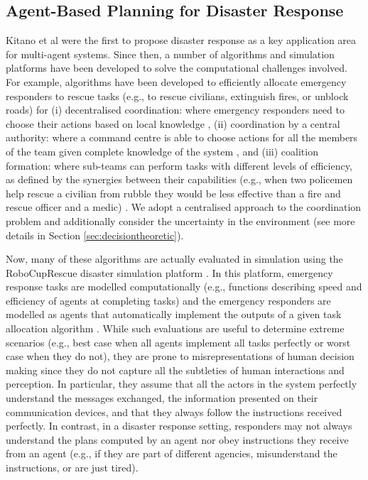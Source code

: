 \subsection{Agent-Based Planning for Disaster Response}\label{sec:agentsdisasters}
Kitano et al \cite{kitano:2001} were the first to propose disaster response as a key application area for multi-agent systems. Since then, a number of algorithms and simulation platforms have been developed to solve the computational challenges involved. For example, algorithms  have been developed to efficiently allocate emergency responders to rescue tasks (e.g., to rescue civilians, extinguish fires, or unblock roads) for (i) decentralised coordination: where emergency responders need to choose their actions based on local knowledge \cite{Chapman2009,puyol:etal:2014}, (ii)  coordination by a central authority: where a command centre is able to choose actions for all the members of the team given complete knowledge of the system \cite{koes2006constraint,Scerri2005,Khan-2011-JAAMAS}, and (iii) coalition formation: where sub-teams can perform tasks with different levels of efficiency, as defined by the synergies between their capabilities (e.g., when two policemen help rescue a civilian from rubble they would be less effective than a fire and rescue officer and a medic) \cite{ramchurn:etal:2010}.  We  adopt a centralised approach to the coordination problem and additionally consider the uncertainty in the environment (see more details in Section \ref{sec:decisiontheoretic}).

Now, many of these algorithms are actually evaluated in simulation using the  RoboCupRescue disaster simulation platform \cite{skinner:ramchurn:2010}. In this platform, emergency response tasks are modelled computationally (e.g., functions describing speed and efficiency of agents at completing tasks) and the emergency responders are modelled as agents that automatically implement the outputs of a given task allocation algorithm \cite{kleiner:etal:2013,ramchurn:etal:2010}. While such evaluations are useful to determine extreme scenarios (e.g., best case when all agents implement all tasks perfectly or worst case when they do not), they are prone to misrepresentations of human decision making since they do not capture all the subtleties of human interactions and perception. In particular, they assume that all the actors in the system perfectly understand the messages exchanged, the information presented on their communication devices, and that they always follow the instructions received perfectly. In contrast, in a disaster response setting, responders may not  always understand the plans computed by an agent nor obey instructions they receive from an agent (e.g., if they are part of different agencies, misunderstand the instructions, or are just tired).

